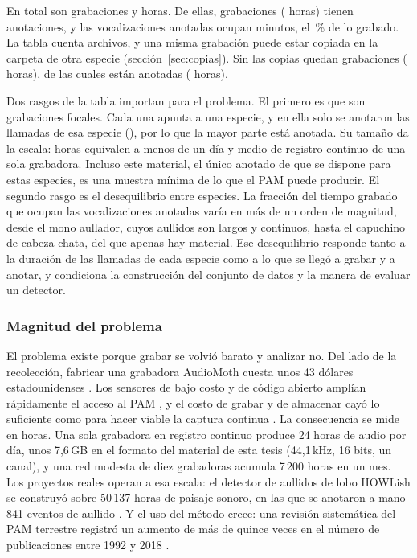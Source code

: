 En total son \gRecordings{} grabaciones y \gHours{} horas. De ellas,
\gAnnotated{} grabaciones (\gAnnotatedHours{} horas) tienen anotaciones, y las
vocalizaciones anotadas ocupan \gEventMinutes{} minutos, el \gEventShare{}\,\% de
lo grabado. La tabla cuenta archivos, y una misma grabación puede estar copiada
en la carpeta de otra especie (sección~\ref{sec:copias}). Sin las
copias quedan \gUniqueRecordings{} grabaciones (\gUniqueHours{} horas), de las
cuales \gUniqueAnnotated{} están anotadas (\gUniqueAnnotatedHours{} horas).

Dos rasgos de la tabla importan para el problema. El primero es que son
grabaciones focales. Cada una apunta a una especie, y en ella solo se anotaron las
llamadas de esa especie (\cpEquipo), por lo que la mayor parte está anotada. Su
tamaño da la escala: \gHours{} horas equivalen a menos de un día y medio de
registro continuo de una sola grabadora. Incluso este material, el único anotado
de que se dispone para estas especies, es una muestra mínima de lo que el PAM
puede producir. El segundo rasgo es el desequilibrio entre especies. La fracción
del tiempo grabado que ocupan las vocalizaciones anotadas varía en más de un orden
de magnitud, desde el mono aullador, cuyos aullidos son largos y continuos, hasta
el capuchino de cabeza chata, del que apenas hay material. Ese desequilibrio
responde tanto a la duración de las llamadas de cada especie como a lo que se
llegó a grabar y a anotar, y condiciona la construcción del conjunto de datos y la
manera de evaluar un detector.

\subsubsection{Magnitud del problema}
\label{sec:magnitud}

El problema existe porque grabar se volvió barato y analizar no. Del lado de la
recolección, fabricar una grabadora AudioMoth cuesta unos 43 dólares
estadounidenses \citep{hill_audiomoth_2018}. Los sensores de bajo costo y de
código abierto amplían rápidamente el acceso al PAM \citep{gibb_2018}, y el costo
de grabar y de almacenar cayó lo suficiente como para hacer viable la captura
continua \citep{stowell_computational_2022}. La consecuencia se mide en horas.
Una sola grabadora en registro continuo produce 24 horas de audio por día, unos
7,6\,GB en el formato del material de esta tesis (44,1\,kHz, 16 bits, un canal), y
una red modesta de diez grabadoras acumula 7\,200 horas en un mes. Los proyectos
reales operan a esa escala: el detector de aullidos de lobo HOWLish se construyó
sobre 50\,137 horas de paisaje sonoro, en las que se anotaron a mano 841 eventos
de aullido \citep{Campos_Krofel_Rio-Maior_Renna_2025}. Y el uso del método crece:
una revisión sistemática del PAM terrestre registró un aumento de más de quince
veces en el número de publicaciones entre 1992 y 2018
\citep{sugai_terrestrial_2019}.

